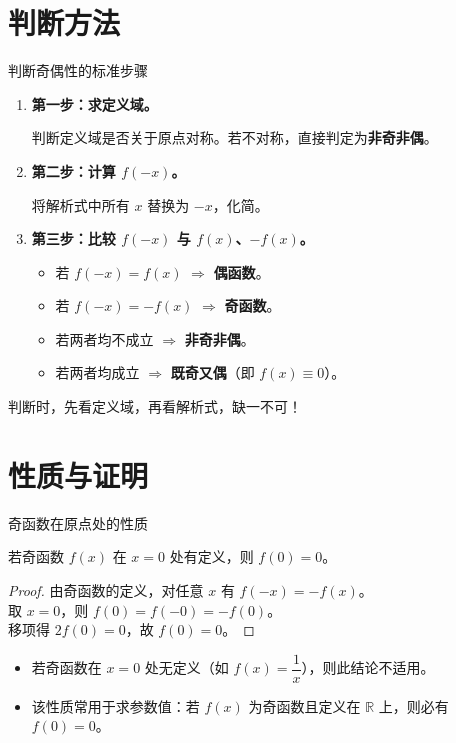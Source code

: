 \documentclass[aspectratio=169,11pt]{ctexbeamer}
\newenvironment{theorem}[1][定理]{\begin{theorembox}[#1]}{\end{theorembox}}
\renewenvironment{theorem}[1][定理]{\begin{theorembox}[#1]}{\end{theorembox}}
\newenvironment{remark}[1][注]{\begin{remarkbox}[#1]}{\end{remarkbox}}
\renewenvironment{remark}[1][注]{\begin{remarkbox}[#1]}{\end{remarkbox}}
\newenvironment{tip}[1][提示]{\begin{tipbox}[#1]}{\end{tipbox}}
\renewenvironment{tip}[1][提示]{\begin{tipbox}[#1]}{\end{tipbox}}
\renewcommand{\frac}{\dfrac}
\begin{document}
	\section{判断方法}
	
	\begin{frame}{判断奇偶性的标准步骤}
		\begin{enumerate}
			\item \textbf{第一步：求定义域。}
			\par 判断定义域是否关于原点对称。若不对称，直接判定为\textbf{非奇非偶}。
			\item \textbf{第二步：计算 $f(-x)$。}
			\par 将解析式中所有 $x$ 替换为 $-x$，化简。
			\item \textbf{第三步：比较 $f(-x)$ 与 $f(x)$、$-f(x)$。}
			\begin{itemize}
				\item 若 $f(-x)=f(x)$ $\Rightarrow$ \textbf{偶函数}。
				\item 若 $f(-x)=-f(x)$ $\Rightarrow$ \textbf{奇函数}。
				\item 若两者均不成立 $\Rightarrow$ \textbf{非奇非偶}。
				\item 若两者均成立 $\Rightarrow$ \textbf{既奇又偶}（即 $f(x)\equiv0$）。
			\end{itemize}
		\end{enumerate}
		\begin{tip}
			判断时，先看定义域，再看解析式，缺一不可！
		\end{tip}
	\end{frame}
	
	\section{性质与证明}
	
	\begin{frame}{奇函数在原点处的性质}
		\begin{theorem}[奇函数在 $x=0$ 处的值]
			若奇函数 $f(x)$ 在 $x=0$ 处有定义，则 $f(0)=0$。
		\end{theorem}
		\pause
		\begin{proof}
			由奇函数的定义，对任意 $x$ 有 $f(-x)=-f(x)$。\\
			取 $x=0$，则 $f(0)=f(-0)=-f(0)$。\\
			移项得 $2f(0)=0$，故 $f(0)=0$。
		\end{proof}
		\pause
		\begin{remark}
			\begin{itemize}
				\item 若奇函数在 $x=0$ 处无定义（如 $f(x)=\frac1x$），则此结论不适用。
				\item 该性质常用于求参数值：若 $f(x)$ 为奇函数且定义在 $\mathbb{R}$ 上，则必有 $f(0)=0$。
			\end{itemize}
		\end{remark}
	\end{frame}
	
\end{document}
